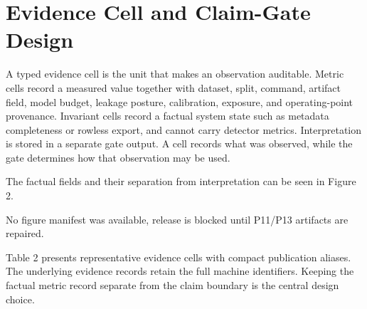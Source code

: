 \documentclass[11pt]{article}
\begin{document}
\section{Evidence Cell and Claim-Gate Design}

A typed evidence cell is the unit that makes an observation auditable. Metric cells record a measured value together with dataset, split, command, artifact field, model budget, leakage posture, calibration, exposure, and operating-point provenance. Invariant cells record a factual system state such as metadata completeness or rowless export, and cannot carry detector metrics. Interpretation is stored in a separate gate output. A cell records what was observed, while the gate determines how that observation may be used.

The factual fields and their separation from interpretation can be seen in Figure 2.

No figure manifest was available, release is blocked until P11/P13 artifacts are repaired.

Table 2 presents representative evidence cells with compact publication aliases. The underlying evidence records retain the full machine identifiers. Keeping the factual metric record separate from the claim boundary is the central design choice.
\end{document}
